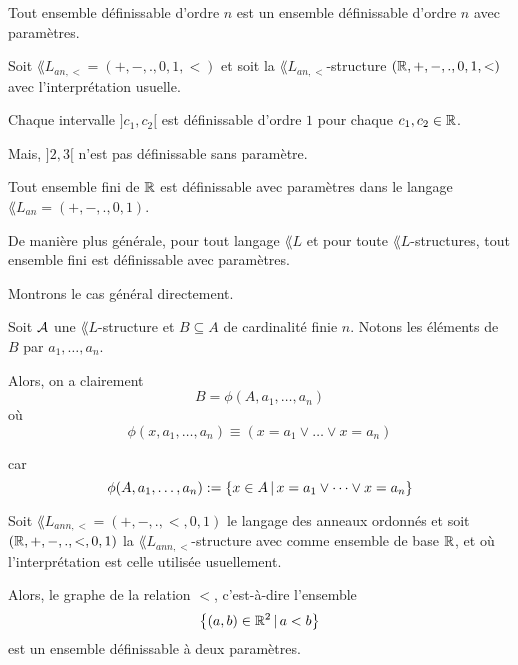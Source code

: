 \documentclass[a4paper, 12pt]{report}
\begin{document}
\begin{remarque}
	Tout ensemble définissable d'ordre $n$ est un ensemble définissable d'ordre
	$n$ avec paramètres.
\end{remarque}

\begin{exemple}
	Soit $\lang{L}_{an, <} = (+, -, ., 0, 1, <)$ et soit la $\lang{L}_{an, <}$-structure
	$(\mathbb{R}, +, -, ., 0, 1, <)$ avec l'interprétation usuelle.

	Chaque intervalle $]c_{1}, c_{2}[$ est définissable d'ordre $1$ pour chaque
	$c_{1}, c_{2} \in \mathbb{R}$.

	Mais, $]2, 3[$ n'est pas définissable sans paramètre.
\end{exemple}

\begin{exercice}
	Tout ensemble fini de $\mathbb{R}$ est définissable avec paramètres dans le
	langage $\lang{L}_{an} =
	(+, -, ., 0, 1)$.

	De manière plus générale, pour tout langage $\lang{L}$ et pour toute
	$\lang{L}$-structures, tout ensemble fini est définissable avec paramètres.
\end{exercice}

\begin{answer}
	Montrons le cas général directement.

	Soit $\mathcal{A}$ une $\lang{L}$-structure et $B \subseteq A$ de cardinalité
	finie $n$. Notons les éléments de $B$ par $a_{1}, \dots, a_{n}$.

	Alors, on a clairement
	\begin{equation}
		B = \phi(A, a_{1}, \dots, a_{n})
	\end{equation}
	où
	\begin{equation}
		\phi(x, a_{1}, \dots, a_{n}) \equiv (x = a_{1} \vee \dots \vee x =
		a_{n})
	\end{equation}

	car
	\begin{equation}
		\phi(A, a_{1}, \dots, a_{n}) := \left\{x \in A \, | \, x = a_{1} \vee \dots
		\vee x = a_{n} \right\}
	\end{equation}
\end{answer}

\begin{proposition}
	Soit $\lang{L}_{ann, <} = (+, -, ., <, 0, 1)$ le langage des anneaux
	ordonnés et soit $(\mathbb{R}, +, -, ., <, 0, 1)$ la $\lang{L}_{ann,
	<}$-structure avec comme ensemble de base $\mathbb{R}$, et où l'interprétation
	est celle utilisée usuellement.

	Alors, le graphe de la relation $<$, c'est-à-dire l'ensemble
	\begin{equation}
		\left\{(a, b) \in \mathbb{R}^{2} \, | \, a < b \right\}
	\end{equation}
	est un ensemble définissable à deux paramètres.
\end{proposition}
\end{document}
